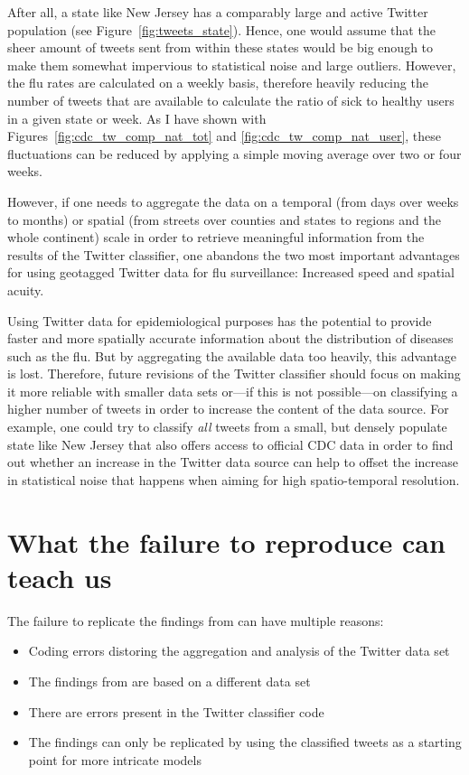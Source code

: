 \documentclass[11pt, a4paper,twoside]{report}\usepackage[]{graphicx}\usepackage[]{color}
\begin{document}
After all, a state like New Jersey has a comparably large and active Twitter population (see Figure~\ref{fig:tweets_state}). Hence, one would assume that the sheer amount of tweets sent from within these states would be big enough to make them somewhat impervious to statistical noise and large outliers. However, the flu rates are calculated on a weekly basis, therefore heavily reducing the number of tweets that are available to calculate the ratio of sick to healthy users in a given state or week. As I have shown with Figures~\ref{fig:cdc_tw_comp_nat_tot} and \ref{fig:cdc_tw_comp_nat_user}, these fluctuations can be reduced by applying a simple moving average over two or four weeks.

However, if one needs to aggregate the data on a temporal (from days over weeks to months) or spatial (from streets over counties and states to regions and the whole continent) scale in order to retrieve meaningful information from the results of the Twitter classifier, one abandons the two most important advantages for using geotagged Twitter data for flu surveillance: Increased speed and spatial acuity.

Using Twitter data for epidemiological purposes has the potential to provide faster and more spatially accurate information about the distribution of diseases such as the flu. But by aggregating the available data too heavily, this advantage is lost. Therefore, future revisions of the Twitter classifier should focus on making it more reliable with smaller data sets or---if this is not possible---on classifying a higher number of tweets in order to increase the content of the data source. For example, one could try to classify \textit{all} tweets from a small, but densely populate state like New Jersey that also offers access to official CDC data in order to find out whether an increase in the Twitter data source can help to offset the increase in statistical noise that happens when aiming for high spatio-temporal resolution.

\section{What the failure to reproduce can teach us}
\label{sec:disc_replication}
The failure to replicate the findings from \citep{bodnar_data_2015} can have multiple reasons: 

\begin{itemize}
\item Coding errors distoring the aggregation and analysis of the Twitter data set
\item The findings from \citep{bodnar_data_2015} are based on a different data set
\item There are errors present in the Twitter classifier code
\item The findings can only be replicated by using the classified tweets as a starting point for more intricate models
\end{itemize}
\end{document}
